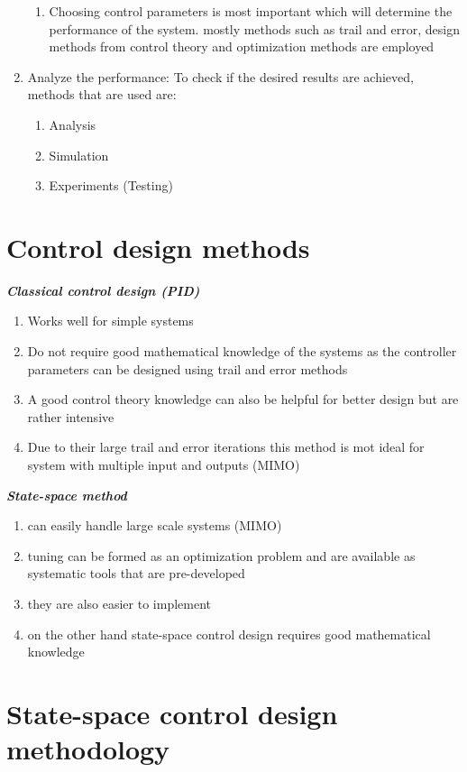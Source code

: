 \begin{enumerate}
\begin{enumerate}
		\item Choosing control parameters is most important which will determine the performance of the system. mostly methods such as trail and error, design methods from control theory and optimization methods are employed
	\end{enumerate}
	\item Analyze the performance: To check if the desired results are achieved, methods that are used are:
	\begin{enumerate}
		\item Analysis
		\item Simulation
		\item Experiments (Testing)
	\end{enumerate}
\end{enumerate}

\section{Control design methods}
\textbf{\textit{Classical control design (PID)}}
\begin{enumerate}
	\item Works well for simple systems
	\item Do not require good mathematical knowledge of the systems as the controller parameters can be designed using trail and error methods
	\item A good control theory knowledge can also be helpful for better design but are rather intensive
	\item Due to their large trail and error iterations this method is mot ideal for system with multiple input and outputs (MIMO)
\end{enumerate}

\textbf{\textit{State-space method}}
\begin{enumerate}
	\item can easily handle large scale systems (MIMO)
	\item tuning can be formed as an optimization problem and are available as systematic tools that are pre-developed
	\item they are also easier to implement
	\item on the other hand state-space control design requires good mathematical knowledge
\end{enumerate}

\section{State-space control design methodology}

